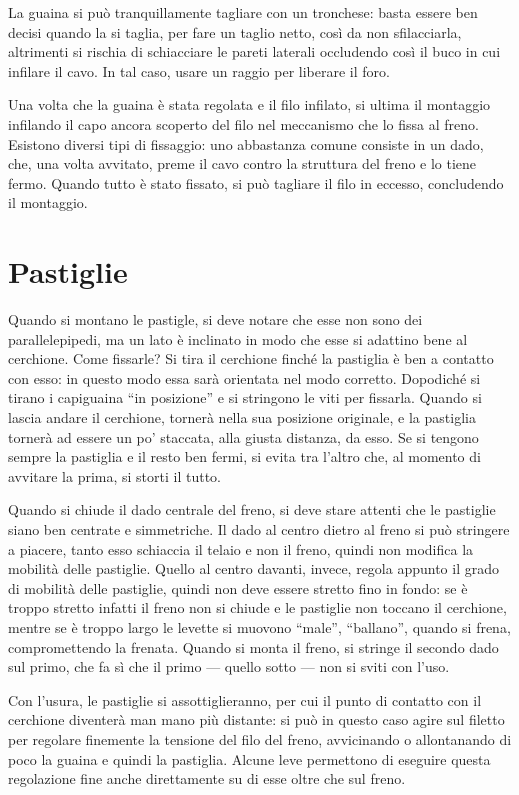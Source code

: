 La guaina si può tranquillamente tagliare con un tronchese: basta essere ben decisi quando la si taglia, per fare un taglio netto, così da non sfilacciarla, altrimenti si rischia di schiacciare le pareti laterali occludendo così il buco in cui infilare il cavo.
In tal caso, usare un raggio per liberare il foro.

Una volta che la guaina è stata regolata e il filo infilato, si ultima il montaggio infilando il capo ancora scoperto del filo nel meccanismo che lo fissa al freno.
Esistono diversi tipi di fissaggio: uno abbastanza comune consiste in un dado, che, una volta avvitato, preme il cavo contro la struttura del freno e lo tiene fermo.
Quando tutto è stato fissato, si può tagliare il filo in eccesso, concludendo il montaggio.

\section{Pastiglie}
Quando si montano le pastigle, si deve notare che esse non sono dei parallelepipedi, ma un lato è inclinato in modo che esse si adattino bene al cerchione.
Come fissarle?
Si tira il cerchione finché la pastiglia è ben a contatto con esso: in questo modo essa sarà orientata nel modo corretto.
Dopodiché si tirano i capiguaina ``in posizione'' e si stringono le viti per fissarla.
Quando si lascia andare il cerchione, tornerà nella sua posizione originale, e la pastiglia tornerà ad essere un po' staccata, alla giusta distanza, da esso.
Se si tengono sempre la pastiglia e il resto ben fermi, si evita tra l'altro che, al momento di avvitare la prima, si storti il tutto.

Quando si chiude il dado centrale del freno, si deve stare attenti che le pastiglie siano ben centrate e simmetriche.
Il dado al centro dietro al freno si può stringere a piacere, tanto esso schiaccia il telaio e non il freno, quindi non modifica la mobilità delle pastiglie.
Quello al centro davanti, invece, regola appunto il grado di mobilità delle pastiglie, quindi non deve essere stretto fino in fondo: se è troppo stretto infatti il freno non si chiude e le pastiglie non toccano il cerchione, mentre se è troppo largo le levette si muovono ``male'', ``ballano'', quando si frena, compromettendo la frenata.
Quando si monta il freno, si stringe il secondo dado sul primo, che fa sì che il primo --- quello sotto --- non si sviti con l'uso. %

Con l'usura, le pastiglie si assottiglieranno, per cui il punto di contatto con il cerchione diventerà man mano più distante: si può in questo caso agire sul filetto per regolare finemente la tensione del filo del freno, avvicinando o allontanando di poco la guaina e quindi la pastiglia.
Alcune leve permettono di eseguire questa regolazione fine anche direttamente su di esse oltre che sul freno.

